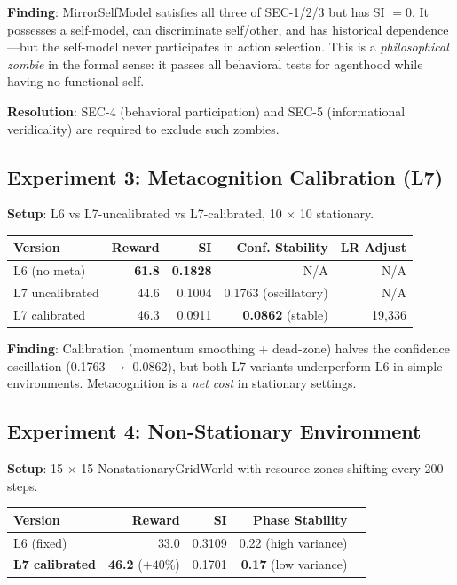 \documentclass[11pt,a4paper]{article}
\begin{document}
\textbf{Finding}: MirrorSelfModel satisfies all three of SEC-1/2/3 but has SI $= 0$. It possesses a self-model, can discriminate self/other, and has historical dependence---but the self-model never participates in action selection. This is a \emph{philosophical zombie} in the formal sense: it passes all behavioral tests for agenthood while having no functional self.

\textbf{Resolution}: SEC-4 (behavioral participation) and SEC-5 (informational veridicality) are required to exclude such zombies.

\subsection{Experiment 3: Metacognition Calibration (L7)}

\textbf{Setup}: L6 vs L7-uncalibrated vs L7-calibrated, 10 $\times$ 10 stationary.

\begin{table}[h]
\centering
\begin{tabular}{lrrrr}
\toprule
Version & Reward & SI & Conf. Stability & LR Adjust \\
\midrule
L6 (no meta) & \textbf{61.8} & \textbf{0.1828} & N/A & N/A \\
L7 uncalibrated & 44.6 & 0.1004 & 0.1763 (oscillatory) & N/A \\
L7 calibrated & 46.3 & 0.0911 & \textbf{0.0862} (stable) & 19,336 \\
\bottomrule
\end{tabular}
\end{table}

\textbf{Finding}: Calibration (momentum smoothing + dead-zone) halves the confidence oscillation (0.1763 $\to$ 0.0862), but both L7 variants underperform L6 in simple environments. Metacognition is a \emph{net cost} in stationary settings.

\subsection{Experiment 4: Non-Stationary Environment}

\textbf{Setup}: 15 $\times$ 15 NonstationaryGridWorld with resource zones shifting every 200 steps.

\begin{table}[h]
\centering
\begin{tabular}{lrrrr}
\toprule
Version & Reward & SI & Phase Stability \\
\midrule
L6 (fixed) & 33.0 & 0.3109 & 0.22 (high variance) \\
\textbf{L7 calibrated} & \textbf{46.2} ($+40\%$) & 0.1701 & \textbf{0.17} (low variance) \\
\bottomrule
\end{tabular}
\end{table}
\end{document}

